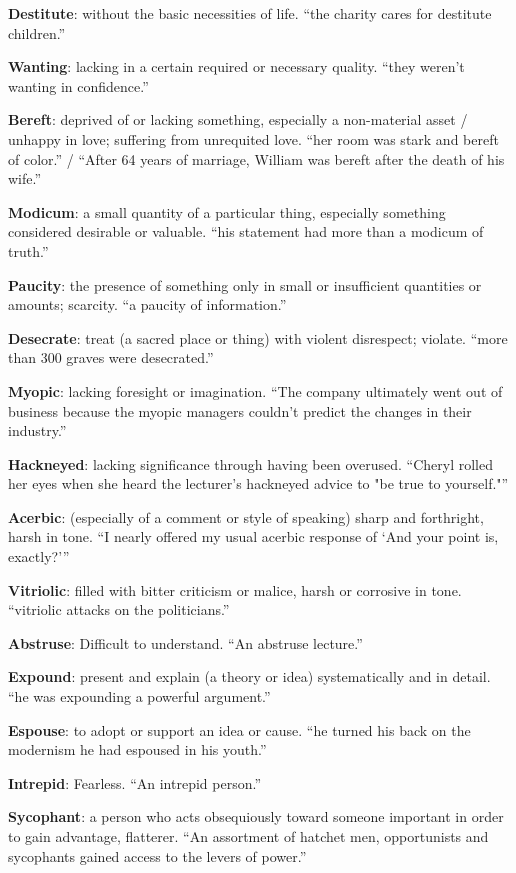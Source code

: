 \documentclass[12pt, a4paper]{ximera}
\begin{document}
\textbf{Destitute}: without the basic necessities of life. ``the charity cares for destitute children.'' 

\textbf{Wanting}: lacking in a certain required or necessary quality. ``they weren't wanting in confidence.''

\textbf{Bereft}: deprived of or lacking something, especially a non-material asset / unhappy in love; suffering from unrequited love. ``her room was stark and bereft of color.'' / ``After 64 years of marriage, William was bereft after the death of his wife.''

\textbf{Modicum}: a small quantity of a particular thing, especially something considered desirable or valuable. ``his statement had more than a modicum of truth.''

\textbf{Paucity}: the presence of something only in small or insufficient quantities or amounts; scarcity. ``a paucity of information.''

\textbf{Desecrate}: treat (a sacred place or thing) with violent disrespect; violate. ``more than 300 graves were desecrated.''

\textbf{Myopic}: lacking foresight or imagination. ``The company ultimately went out of business because the myopic managers couldn't predict the changes in their industry.''

\textbf{Hackneyed}: lacking significance through having been overused. ``Cheryl rolled her eyes when she heard the lecturer's hackneyed advice to "be true to yourself."''

\textbf{Acerbic}: (especially of a comment or style of speaking) sharp and forthright, harsh in tone. ``I nearly offered my usual acerbic response of ‘And your point is, exactly?’''

\textbf{Vitriolic}: filled with bitter criticism or malice, harsh or corrosive in tone. ``vitriolic attacks on the politicians.''

\textbf{Abstruse}: Difficult to understand. ``An abstruse lecture.''

\textbf{Expound}: present and explain (a theory or idea) systematically and in detail. ``he was expounding a powerful argument.''

\textbf{Espouse}: to adopt or support an idea or cause. ``he turned his back on the modernism he had espoused in his youth.''

\textbf{Intrepid}: Fearless. ``An intrepid person.''

\textbf{Sycophant}: a person who acts obsequiously toward someone important in order to gain advantage, flatterer. ``An assortment of hatchet men, opportunists and sycophants gained access to the levers of power.''
\end{document}
